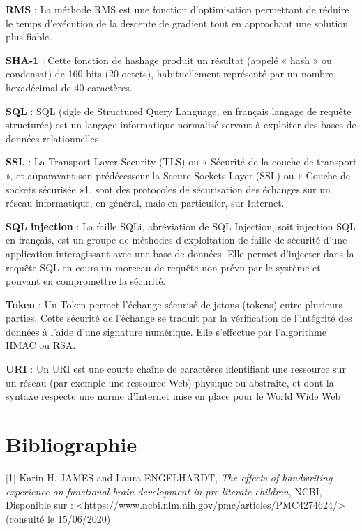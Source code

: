 \documentclass[oneside,a4paper,13pt]{article}
\begin{document}
\medbreak
\textbf{RMS} : La méthode RMS est une fonction d'optimisation permettant de réduire le temps d'exécution de la descente de gradient tout en approchant une solution plus fiable.

\medbreak
\textbf{SHA-1} :  Cette fonction de hashage produit un résultat (appelé « hash » ou condensat) de 160 bits (20 octets), habituellement représenté par un nombre hexadécimal de 40 caractères.

\medbreak
\textbf{SQL} : SQL (sigle de Structured Query Language, en français langage de requête structurée) est un langage informatique normalisé servant à exploiter des bases de données relationnelles.

\medbreak
\textbf{SSL} : La Transport Layer Security (TLS) ou « Sécurité de la couche de transport », et auparavant son prédécesseur la Secure Sockets Layer (SSL) ou « Couche de sockets sécurisée »1, sont des protocoles de sécurisation des échanges sur un réseau informatique, en général, mais en particulier, sur Internet.


\medbreak
\textbf{SQL injection} : La faille SQLi, abréviation de SQL Injection, soit injection SQL en français, est un groupe de méthodes d'exploitation de faille de sécurité d'une application interagissant avec une base de données. Elle permet d'injecter dans la requête SQL en cours un morceau de requête non prévu par le système et pouvant en compromettre la sécurité.

\medbreak
\textbf{Token} : Un Token permet l'échange sécurisé de jetons (tokens) entre plusieurs parties. Cette sécurité de l’échange se traduit par la vérification de l’intégrité des données à l’aide d’une signature numérique. Elle s’effectue par l'algorithme HMAC ou RSA.

\medbreak
\textbf{URI} : Un URI est une courte chaîne de caractères identifiant une ressource sur un réseau (par exemple une ressource Web) physique ou abstraite, et dont la syntaxe respecte une norme d'Internet mise en place pour le World Wide Web


\section{Bibliographie}

[1] Karin H. JAMES and Laura ENGELHARDT, \textit{The effects of handwriting experience on functional brain development in pre-literate children}, NCBI,\\ 
Disponible sur : <https://www.ncbi.nlm.nih.gov/pmc/articles/PMC4274624/> (consulté le 15/06/2020)
\end{document}
